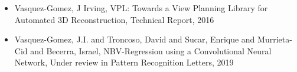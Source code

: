 \begin{itemize} 
\item Vasquez-Gomez, J Irving, VPL: Towards a View Planning Library for Automated 3D Reconstruction, Technical Report, 2016 
\item Vasquez-Gomez, J.I. and Troncoso, David and Sucar, Enrique and Murrieta-Cid and Becerra, Israel, NBV-Regression using a Convolutional Neural Network, Under review in Pattern Recognition Letters, 2019 
\end{itemize} 
